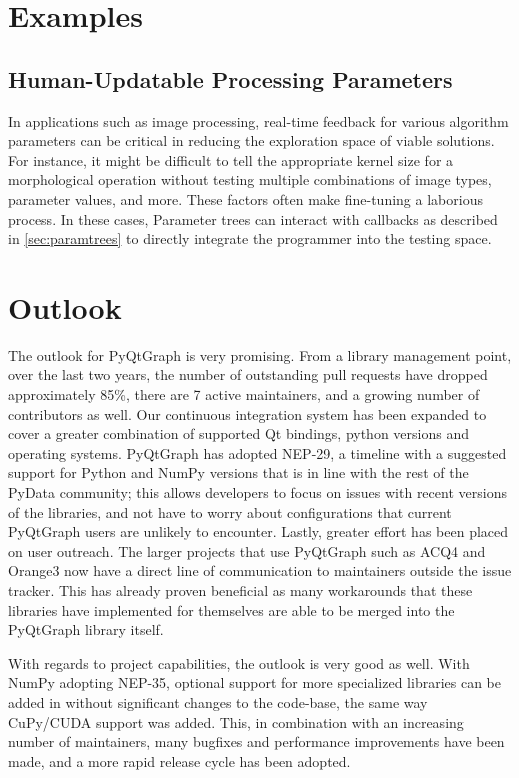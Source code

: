 \documentclass[journal]{vgtc}                %
\begin{document}
\section{Examples}\label{sec:examples}

\subsection{Human-Updatable Processing Parameters}
In applications such as image processing, real-time feedback for various algorithm parameters can be critical in reducing the exploration space of viable solutions. For instance, it might be difficult to tell the appropriate kernel size for a morphological operation without testing multiple combinations of image types, parameter values, and more. These factors often make fine-tuning a laborious process. In these cases, Parameter trees can interact with callbacks as described in \autoref{sec:paramtrees} to directly integrate the programmer into the testing space.

\section{Outlook}

The outlook for PyQtGraph is very promising.  From a library management point, over the last two years, the number of outstanding pull requests have dropped approximately 85\%, there are 7 active maintainers, and a growing number of contributors as well.  Our continuous integration system has been expanded to cover a greater combination of supported Qt bindings, python versions and operating systems.  PyQtGraph has adopted NEP-29, a timeline with a suggested support for Python and NumPy versions that is in line with the rest of the PyData community; this allows developers to focus on issues with recent versions of the libraries, and not have to worry about configurations that current PyQtGraph users are unlikely to encounter.  Lastly, greater effort has been placed on user outreach.  The larger projects that use PyQtGraph such as ACQ4 and Orange3 now have a direct line of communication to maintainers outside the issue tracker.  This has already proven beneficial as many workarounds that these libraries have implemented for themselves are able to be merged into the PyQtGraph library itself.

With regards to project capabilities, the outlook is very good as well.  With NumPy adopting NEP-35, optional support for more specialized libraries can be added in without significant changes to the code-base, the same way CuPy/CUDA support was added.  This, in combination with an increasing number of maintainers, many bugfixes and performance improvements have been made, and a more rapid release cycle has been adopted.
\end{document}
